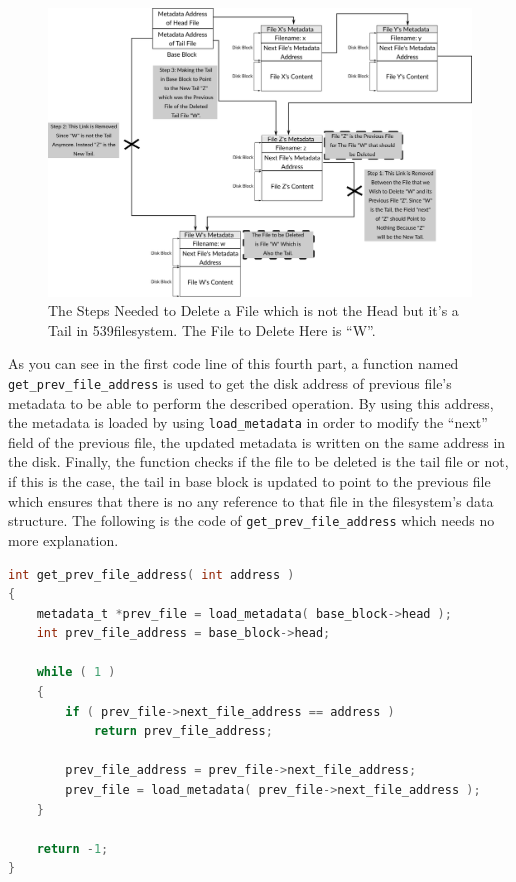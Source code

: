 \begin{figure}
\centering
\includegraphics[width=1.00000\textwidth]{Figures/filesystem-ch/delete_file_not_head_but_tail_case.png}
\caption{The Steps Needed to Delete a File which is not the Head but
it's a Tail in 539filesystem. The File to Delete Here is
``W''.}\label{fig:delete_file_not_head_but_tail_case}
\end{figure}

As you can see in the first code line of this fourth part, a function
named \lstinline!get_prev_file_address! is used to get the disk address
of previous file's metadata to be able to perform the described
operation. By using this address, the metadata is loaded by using
\lstinline!load_metadata! in order to modify the ``next'' field of the
previous file, the updated metadata is written on the same address in
the disk. Finally, the function checks if the file to be deleted is the
tail file or not, if this is the case, the tail in base block is updated
to point to the previous file which ensures that there is no any
reference to that file in the filesystem's data structure. The following
is the code of \lstinline!get_prev_file_address! which needs no more
explanation.

\begin{lstlisting}[language=C]
int get_prev_file_address( int address )
{
    metadata_t *prev_file = load_metadata( base_block->head );
    int prev_file_address = base_block->head;

    while ( 1 )
    {
        if ( prev_file->next_file_address == address )
            return prev_file_address;
        
        prev_file_address = prev_file->next_file_address;
        prev_file = load_metadata( prev_file->next_file_address );
    }
        
    return -1;
}
\end{lstlisting}

